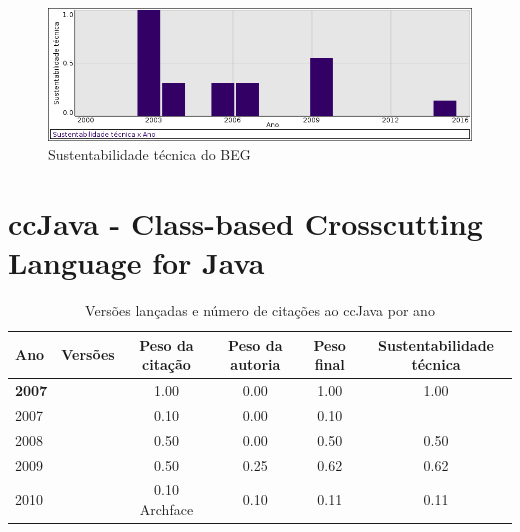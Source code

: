 \begin{figure}[h]
  \center
  \includegraphics[scale=0.50]{imagens/softwares-charts/beg.png}
  \caption{Sustentabilidade técnica do BEG}
\end{figure}


\section{ccJava - Class-based Crosscutting Language for Java}


\begin{table}[H]
\caption{Versões lançadas e número de citações ao ccJava por ano}
\centering
\begin{tabular}{| l | c | c | c | c | c |}
  \hline
  Ano & Versões & Peso da citação & Peso da autoria & Peso final & Sustentabilidade técnica \\
  \hline
            {\bf 2007}
          &
          
          &
          1.00
          &
          0.00
          &
          1.00
          &
            {\color{blue} 1.00}
          \\
            2007
          &
          
          &
          0.10
          &
          0.00
          &
          0.10
          &
          \\
\hline
            2008
          &
          
          &
          0.50
          &
          0.00
          &
          0.50
          &
            {\color{blue} 0.50}
          \\
\hline
            2009
          &
          
          &
          0.50
          &
          0.25
          &
          0.62
          &
            {\color{blue} 0.62}
          \\
\hline
            2010
          &
          
          &
          0.10
            {\tiny Archface}
          &
          0.10
          &
          0.11
          &
            {\color{red} 0.11}
          \\
\hline
\end{tabular}
\end{table}

